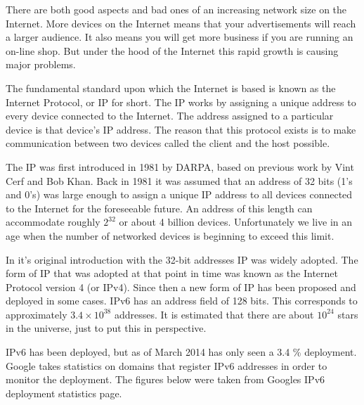 %

There are both good aspects and bad ones of an increasing network size on the Internet. More devices on the Internet
means that your advertisements will reach a larger audience. It also means you will get more business if 
you are running an on-line shop. But under the hood of the Internet this rapid growth is causing major problems. 


The fundamental standard upon which the Internet is based is known as the Internet Protocol, or IP for short. The IP works by assigning a unique address to every device connected to the Internet. The address assigned to a particular device is that device's IP address. The reason that this protocol exists is to make communication between two devices called the client and the host possible. 


The IP was first introduced in 1981 by DARPA\cite{rfc0791}, based on previous work by Vint Cerf and Bob Khan\cite{1092259}. Back in 1981 it was assumed that an address of 32 bits (1's and 0's) was large enough to assign a unique IP address to all devices connected to the Internet for the foreseeable future. An address of this length can accommodate roughly $2^{32}$ or about 4 billion devices. Unfortunately we live in an age when the number of networked devices is beginning to exceed this limit.


In it's original introduction with the 32-bit addresses IP was widely adopted. The form of IP that was adopted at that point in time was known as the Internet Protocol version 4 (or IPv4). Since then a new form of IP has been proposed\cite{rfc1883}\cite{rfc2460} and deployed in some cases. IPv6 has an address field of 128 bits. This corresponds to approximately $3.4 \times 10^{38}$ addresses. It is estimated that there are about $10^{24}$ stars in the universe, just to put this in perspective.


IPv6 has been deployed, but as of March 2014 has only seen a 3.4 \% deployment.\cite{goog} Google takes statistics on domains that register IPv6 addresses in order to monitor the deployment. The figures below were taken from Googles IPv6 deployment statistics page. 




\cite{sxsc}







   